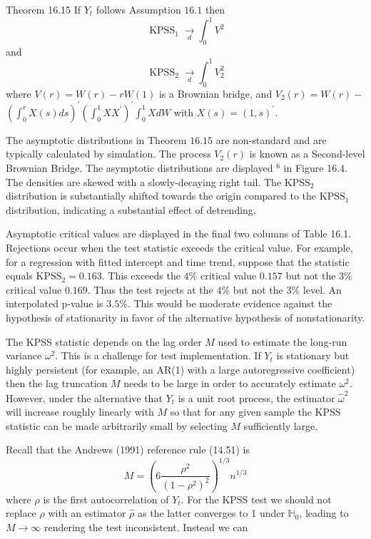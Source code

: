 \documentclass[10pt]{article}
\begin{document}
Theorem 16.15 If $Y_{t}$ follows Assumption $16.1$ then
$$
\operatorname{KPSS}_{1} \underset{d}{\longrightarrow} \int_{0}^{1} V^{2}
$$
and
$$
\operatorname{KPSS}_{2} \underset{d}{\longrightarrow} \int_{0}^{1} V_{2}^{2}
$$
where $V(r)=W(r)-r W(1)$ is a Brownian bridge, and $V_{2}(r)=W(r)-$ $\left(\int_{0}^{r} X(s) d s\right)^{\prime}\left(\int_{0}^{1} X X^{\prime}\right)^{\prime} \int_{0}^{1} X d W$ with $X(s)=(1, s)^{\prime}$.

The asymptotic distributions in Theorem $16.15$ are non-standard and are typically calculated by simulation. The process $V_{2}(r)$ is known as a Second-level Brownian Bridge. The asymptotic distributions are displayed ${ }^{6}$ in Figure 16.4. The densities are skewed with a slowly-decaying right tail. The $\mathrm{KPSS}_{2}$ distribution is substantially shifted towards the origin compared to the $\mathrm{KPSS}_{1}$ distribution, indicating a substantial effect of detrending.

Asymptotic critical values are displayed in the final two columns of Table 16.1. Rejections occur when the test statistic exceeds the critical value. For example, for a regression with fitted intercept and time trend, suppose that the statistic equals $\mathrm{KPSS}_{2}=0.163$. This exceeds the $4 \%$ critical value $0.157$ but not the $3 \%$ critical value $0.169$. Thus the test rejects at the $4 \%$ but not the $3 \%$ level. An interpolated p-value is $3.5 \%$. This would be moderate evidence against the hypothesis of stationarity in favor of the alternative hypothesis of nonstationarity.

The KPSS statistic depends on the lag order $M$ used to estimate the long-run variance $\omega^{2}$. This is a challenge for test implementation. If $Y_{t}$ is stationary but highly persistent (for example, an AR(1) with a large autoregressive coefficient) then the lag truncation $M$ needs to be large in order to accurately estimate $\omega^{2}$. However, under the alternative that $Y_{t}$ is a unit root process, the estimator $\widehat{\omega}^{2}$ will increase roughly linearly with $M$ so that for any given sample the KPSS statistic can be made arbitrarily small by selecting $M$ sufficiently large.

Recall that the Andrews (1991) reference rule (14.51) is
$$
M=\left(6 \frac{\rho^{2}}{\left(1-\rho^{2}\right)^{2}}\right)^{1 / 3} n^{1 / 3}
$$
where $\rho$ is the first autocorrelation of $Y_{t}$. For the KPSS test we should not replace $\rho$ with an estimator $\widehat{\rho}$ as the latter converges to 1 under $\mathbb{H}_{0}$, leading to $M \rightarrow \infty$ rendering the test inconsistent. Instead we can
\end{document}
